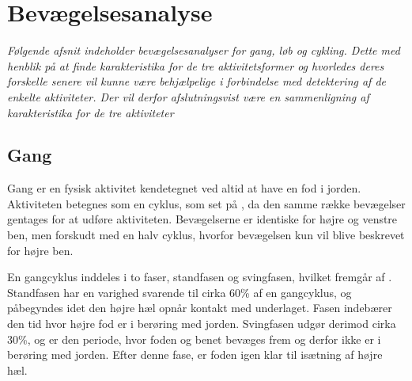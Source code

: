 \section{Bevægelsesanalyse} \label{bevaegelse}
%
\textit{Følgende afsnit indeholder bevægelsesanalyser for gang, løb og cykling. Dette med henblik på at finde karakteristika for de tre aktivitetsformer og hvorledes deres forskelle senere vil kunne være behjælpelige i forbindelse med detektering af de enkelte aktiviteter. Der vil derfor afslutningsvist være en sammenligning af karakteristika for de tre aktiviteter}

\subsection{Gang}
Gang er en fysisk aktivitet kendetegnet ved altid at have en fod i jorden. Aktiviteten betegnes som en cyklus, som set på , da den samme række bevægelser gentages for at udføre aktiviteten. Bevægelserne er identiske for højre og venstre ben, men forskudt med en halv cyklus, hvorfor bevægelsen kun vil blive beskrevet for højre ben. \citep{VaughanDavisOConnor1992,Whittle1990} 

En gangcyklus inddeles i to faser, standfasen og svingfasen, hvilket fremgår af . Standfasen har en varighed svarende til cirka 60\% af en gangcyklus, og påbegyndes idet den højre hæl opnår kontakt med underlaget. Fasen indebærer den tid hvor højre fod er i berøring med jorden. Svingfasen udgør derimod cirka 30\%, og er den periode, hvor foden og benet bevæges frem og derfor ikke er i berøring med jorden. Efter denne fase, er foden igen klar til isætning af højre hæl. \citep{VaughanDavisOConnor1992}

